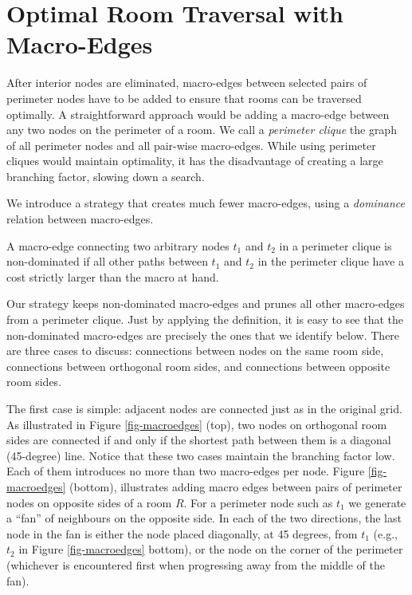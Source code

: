 \section{Optimal Room Traversal with Macro-Edges}

After interior nodes are eliminated, 
macro-edges between selected pairs of perimeter nodes 
have to be added to ensure that rooms can be traversed optimally.
A straightforward approach would be adding a macro-edge between 
any two nodes on the perimeter of a room. 
We call a \emph{perimeter clique} the graph of all perimeter nodes and
all pair-wise macro-edges.
While using perimeter cliques would maintain optimality, it has the disadvantage
of creating a large branching factor, slowing down a search.

We introduce a strategy that creates much fewer macro-edges, 
using a \emph{dominance} relation between macro-edges.
%

\begin{definition}
A macro-edge connecting two 
arbitrary nodes $t_1$ and $t_2$ in a perimeter clique
is non-dominated if all other paths between $t_1$ and $t_2$
in the perimeter clique have a cost strictly larger than the macro at hand.
\end{definition}

Our strategy keeps non-dominated macro-edges and prunes all other macro-edges
from a perimeter clique.
Just by applying the definition, 
it is easy to see that the non-dominated macro-edges are precisely the ones that
we identify below.
There are three cases to discuss: connections between nodes
on the same room side,
connections between orthogonal room sides, 
and connections between opposite room sides.

The first case is simple: adjacent nodes are connected just as in the original grid.
As illustrated in Figure \ref{fig-macroedges} (top),
two nodes on orthogonal room sides are connected if and only if
the shortest path between them is a diagonal (45-degree) line.
Notice that these two cases maintain the branching factor low.
Each of them introduces no more than two macro-edges per node.
Figure \ref{fig-macroedges} (bottom), illustrates adding macro 
edges between pairs of perimeter nodes on opposite sides of a room $R$.
For a perimeter node such as $t_1$ we generate a ``fan'' of neighbours on the opposite side. 
In each of the two directions, the last node in the fan is either 
the node placed diagonally, at 45 degrees, from $t_1$ (e.g., $t_2$ in Figure \ref{fig-macroedges} bottom),
or the node on the corner of the perimeter (whichever is encountered first when progressing away from the
middle of the fan).

